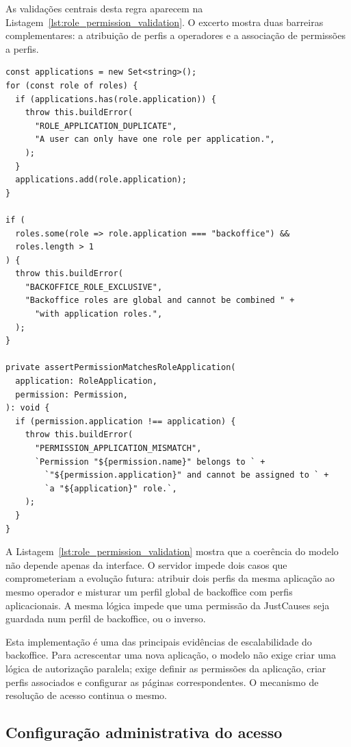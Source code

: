As validações centrais desta regra aparecem na Listagem~\ref{lst:role_permission_validation}. O excerto mostra duas barreiras complementares: a atribuição de perfis a operadores e a associação de permissões a perfis.

\begin{lstlisting}[caption={Validações de perfis e permissões por aplicação}, label={lst:role_permission_validation}]
const applications = new Set<string>();
for (const role of roles) {
  if (applications.has(role.application)) {
    throw this.buildError(
      "ROLE_APPLICATION_DUPLICATE",
      "A user can only have one role per application.",
    );
  }
  applications.add(role.application);
}

if (
  roles.some(role => role.application === "backoffice") &&
  roles.length > 1
) {
  throw this.buildError(
    "BACKOFFICE_ROLE_EXCLUSIVE",
    "Backoffice roles are global and cannot be combined " +
      "with application roles.",
  );
}

private assertPermissionMatchesRoleApplication(
  application: RoleApplication,
  permission: Permission,
): void {
  if (permission.application !== application) {
    throw this.buildError(
      "PERMISSION_APPLICATION_MISMATCH",
      `Permission "${permission.name}" belongs to ` +
        `"${permission.application}" and cannot be assigned to ` +
        `a "${application}" role.`,
    );
  }
}
\end{lstlisting}

A Listagem~\ref{lst:role_permission_validation} mostra que a coerência do modelo não depende apenas da interface. O servidor impede dois casos que comprometeriam a evolução futura: atribuir dois perfis da mesma aplicação ao mesmo operador e misturar um perfil global de backoffice com perfis aplicacionais. A mesma lógica impede que uma permissão da JustCauses seja guardada num perfil de backoffice, ou o inverso.

Esta implementação é uma das principais evidências de escalabilidade do backoffice. Para acrescentar uma nova aplicação, o modelo não exige criar uma lógica de autorização paralela; exige definir as permissões da aplicação, criar perfis associados e configurar as páginas correspondentes. O mecanismo de resolução de acesso continua o mesmo.

\subsection{Configuração administrativa do acesso}
\label{subsec:impl_access_admin}

